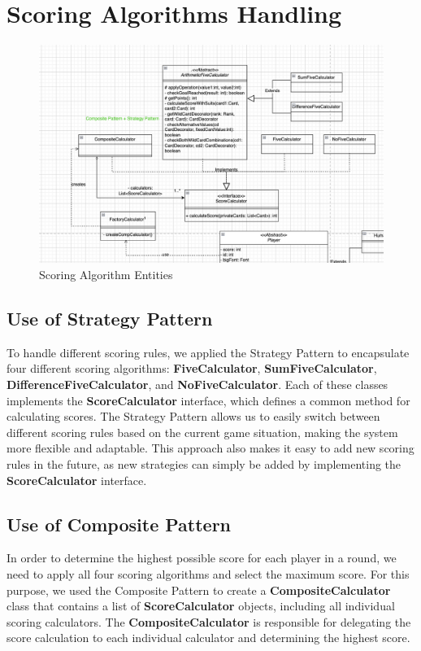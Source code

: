 \documentclass[a4paper, 12pt]{report}
\begin{document}
    \section{Scoring Algorithms Handling}
    \begin{figure}[htbp]
        \centering
        \includegraphics[width=1\linewidth]{Scoring.png}
        \caption{Scoring Algorithm Entities}
        \label{fig:enter-label}
    \end{figure}
    
    \subsection{Use of Strategy Pattern}
    
    To handle different scoring rules, we applied the Strategy Pattern to encapsulate four different scoring algorithms: \textbf{FiveCalculator}, \textbf{SumFiveCalculator}, \textbf{DifferenceFiveCalculator}, and \textbf{NoFiveCalculator}. Each of these classes implements the \textbf{ScoreCalculator} interface, which defines a common method for calculating scores. The Strategy Pattern allows us to easily switch between different scoring rules based on the current game situation, making the system more flexible and adaptable. This approach also makes it easy to add new scoring rules in the future, as new strategies can simply be added by implementing the \textbf{ScoreCalculator} interface.
    
    \subsection{Use of Composite Pattern}
    In order to determine the highest possible score for each player in a round, we need to apply all four scoring algorithms and select the maximum score. For this purpose, we used the Composite Pattern to create a \textbf{CompositeCalculator} class that contains a list of \textbf{ScoreCalculator} objects, including all individual scoring calculators. The \textbf{CompositeCalculator} is responsible for delegating the score calculation to each individual calculator and determining the highest score.
    
\end{document}
